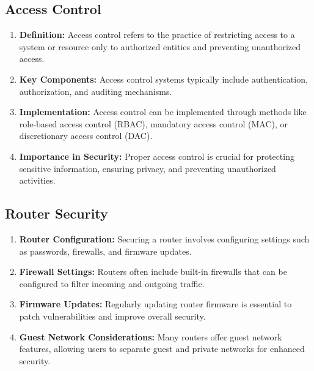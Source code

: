 \documentclass[11pt]{article}
\begin{document}
\subsection{Access Control}
\begin{enumerate}
  \item \textbf{Definition:} Access control refers to the practice of restricting access to a system or resource only to authorized entities and preventing unauthorized access.

  \item \textbf{Key Components:} Access control systems typically include authentication, authorization, and auditing mechanisms.

  \item \textbf{Implementation:} Access control can be implemented through methods like role-based access control (RBAC), mandatory access control (MAC), or discretionary access control (DAC).

  \item \textbf{Importance in Security:} Proper access control is crucial for protecting sensitive information, ensuring privacy, and preventing unauthorized activities.

\end{enumerate}

\subsection{Router Security}
\begin{enumerate}
  \item \textbf{Router Configuration:} Securing a router involves configuring settings such as passwords, firewalls, and firmware updates.

  \item \textbf{Firewall Settings:} Routers often include built-in firewalls that can be configured to filter incoming and outgoing traffic.

  \item \textbf{Firmware Updates:} Regularly updating router firmware is essential to patch vulnerabilities and improve overall security.

  \item \textbf{Guest Network Considerations:} Many routers offer guest network features, allowing users to separate guest and private networks for enhanced security.

\end{enumerate}
\end{document}
